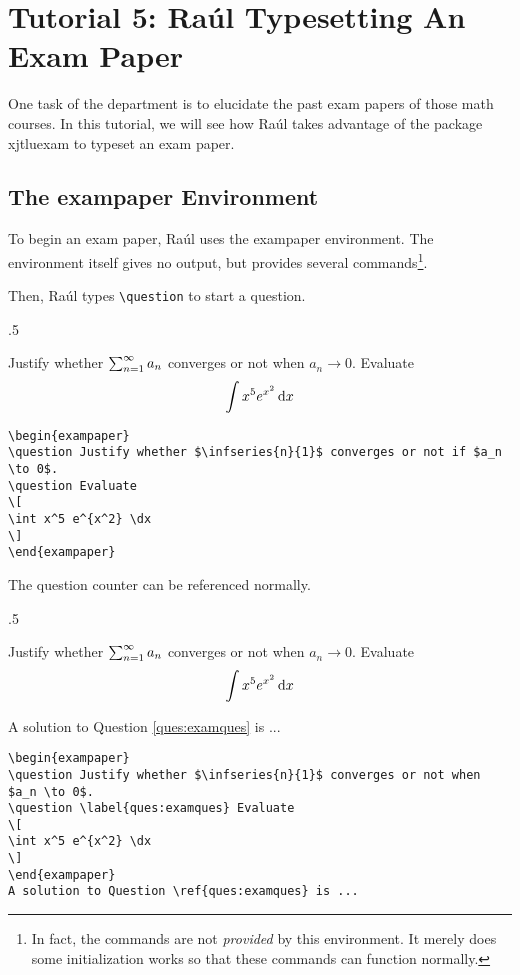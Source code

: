 \newcommand{\raul}{Ra\'ul}
\section{Tutorial 5: \raul{} Typesetting An Exam Paper}
One task of the department is to elucidate the past exam papers of those math courses. In this tutorial, we will see how \raul{} takes advantage of the package xjtluexam to typeset an exam paper.

\subsection{The exampaper Environment}
To begin an exam paper, \raul{} uses the exampaper environment. The environment itself gives no output, but provides several commands\footnote{In fact, the commands are not \emph{provided} by this environment. It merely does some initialization works so that these commands can function normally.}.

Then, \raul{} types \verb=\question= to start a question.
\begin{miniexammar}{.5\textandmarginlen}{
\begin{exampaper}
\question Justify whether $\sum_{n=1}^{\infty}{a_{n}}$ converges or not when $a_n \to 0$.
\question Evaluate
\[
\int x^5 e^{x^2} \,\mathrm{d} x
\]
\end{exampaper}
}
\begin{lstlisting}
\begin{exampaper}
\question Justify whether $\infseries{n}{1}$ converges or not if $a_n \to 0$.
\question Evaluate
\[
\int x^5 e^{x^2} \dx
\]
\end{exampaper}
\end{lstlisting}
\end{miniexammar}

The question counter can be referenced normally.
\begin{miniexammar}{.5\textandmarginlen}{
\begin{exampaper}
\question Justify whether $\sum_{n=1}^{\infty}{a_{n}}$ converges or not when $a_n \to 0$.
\question \label{ques:examques} Evaluate
\[
\int x^5 e^{x^2} \,\mathrm{d} x
\]
\end{exampaper}
A solution to Question \ref{ques:examques} is ...
}
\begin{lstlisting}
\begin{exampaper}
\question Justify whether $\infseries{n}{1}$ converges or not when $a_n \to 0$.
\question \label{ques:examques} Evaluate
\[
\int x^5 e^{x^2} \dx
\]
\end{exampaper}
A solution to Question \ref{ques:examques} is ...
\end{lstlisting}
\end{miniexammar}

